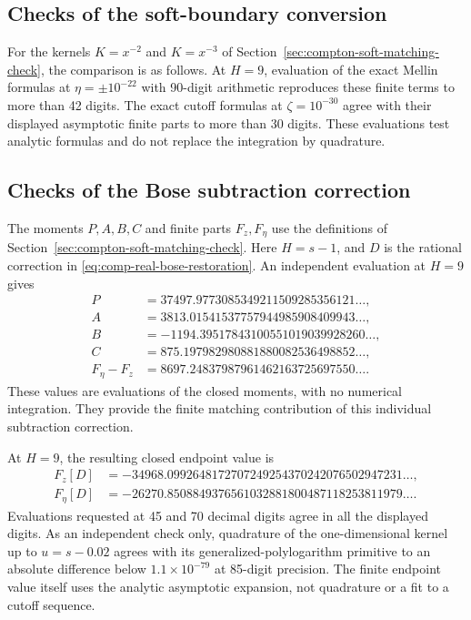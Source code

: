\subsection{Checks of the soft-boundary conversion}
For the kernels $K=x^{-2}$ and $K=x^{-3}$ of
Section~\ref{sec:compton-soft-matching-check}, the comparison is as follows.
At $H=9$,
evaluation of the exact Mellin formulas at $\eta=\pm10^{-22}$ with
90-digit arithmetic reproduces these finite terms to more than 42 digits.
The exact cutoff formulas at $\zeta=10^{-30}$ agree with their displayed
asymptotic finite parts to more than 30 digits.  These evaluations test
analytic formulas and do not replace the integration by quadrature.

\subsection{Checks of the Bose subtraction correction}
The moments $P,A,B,C$ and finite parts $F_z,F_\eta$ use the definitions
of Section~\ref{sec:compton-soft-matching-check}. Here $H=s-1$,
and $D$ is the rational correction in
\eqref{eq:comp-real-bose-restoration}.
An independent evaluation at $H=9$ gives
\begin{align}
 P&=37497.9773085349211509285356121\ldots,\\
 A&=3813.01541537757944985908409943\ldots,\\
 B&=-1194.39517843100551019039928260\ldots,\\
 C&=875.197982980881880082536498852\ldots,\\
 F_\eta-F_z&=8697.24837987961462163725697550\ldots.
\end{align}
These values are evaluations of the closed moments, with no numerical
integration.  They provide the finite matching contribution of this
individual subtraction correction.

At $H=9$, the resulting closed endpoint value is
\begin{align}
 F_z[D]&=-34968.0992648172707249254370242076502947231\ldots,\\
 F_\eta[D]&=-26270.8508849376561032881800487118253811979\ldots.
\end{align}
Evaluations requested at 45 and 70 decimal digits agree in all the displayed
digits.  As an independent check only, quadrature of the one-dimensional
kernel up to $u=s-0.02$ agrees with its generalized-polylogarithm primitive
to an absolute difference below $1.1\times10^{-79}$ at 85-digit precision.
The finite endpoint value itself uses the analytic asymptotic expansion,
not quadrature or a fit to a cutoff sequence.


